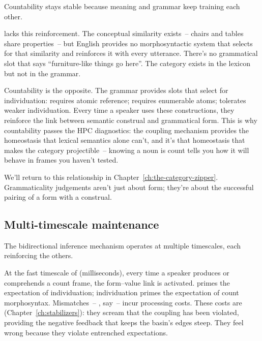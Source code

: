 Countability stays stable because meaning and grammar keep training each other.

 lacks this reinforcement. The conceptual similarity exists~-- chairs and tables share properties~-- but English provides no morphosyntactic system that selects for that similarity and reinforces it with every utterance. There's no grammatical slot that says \enquote{furniture-like things go here}. The category exists in the lexicon but not in the grammar.

Countability is the opposite. The grammar provides slots that select for individuation:  requires atomic reference;  requires enumerable atoms;  tolerates weaker individuation. Every time a speaker uses these constructions, they reinforce the link between semantic construal and grammatical form. This is why countability passes the HPC diagnostics: the coupling mechanism provides the homeostasis that lexical semantics alone can't, and it's that homeostasis that makes the category projectible~-- knowing a noun is count tells you how it will behave in frames you haven't tested.

We'll return to this relationship in Chapter~\ref{ch:the-category-zipper}. Grammaticality judgements aren't just about form; they're about the successful pairing of a form with a construal.
\subsection{Multi-timescale maintenance}
\label{sec:9:multi-timescale}

The bidirectional inference mechanism operates at multiple timescales, each reinforcing the others.

At the fast timescale of  (milliseconds), every time a speaker produces or comprehends a count frame, the form--value link is activated.  primes the expectation of individuation; individuation primes the expectation of count morphosyntax. Mismatches~-- \ungram{}, say~-- incur processing costs. These costs are  (Chapter~\ref{ch:stabilizers}): they scream that the coupling has been violated, providing the negative feedback that keeps the basin's edges steep. They feel wrong because they violate entrenched expectations.

